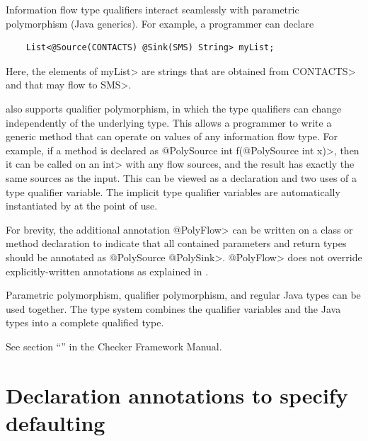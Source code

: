Information flow type qualifiers interact seamlessly with parametric polymorphism (Java
generics).  For example, a programmer can declare

\begin{Verbatim}
    List<@Source(CONTACTS) @Sink(SMS) String> myList;
\end{Verbatim}
\noindent
Here, the elements of \<myList> are strings
that are obtained from \<CONTACTS> and that may flow to \<SMS>.

\TheFlowChecker also supports qualifier polymorphism, in
which the type qualifiers can change independently of the underlying type.
This allows a programmer to write a generic method that can operate on values of
any information flow type.
For example, if a method is declared as
\<@PolySource int f(@PolySource int x)>, then it can be called on an \<int>
with any flow sources, and the result has exactly the same sources as the
input.  This can be viewed as a declaration and two uses of a type
qualifier variable.  The implicit type qualifier variables are
automatically instantiated by \theFlowChecker at the point of use.

For brevity,
the additional
annotation \<@PolyFlow> can be written on a class or method declaration to indicate that
all contained parameters and return types should be annotated as \<@PolySource
@PolySink>.  \<@PolyFlow> does not override explicitly-written annotations as explained
in .


Parametric polymorphism, qualifier polymorphism, and regular Java types can
be used together.  The type system combines the
qualifier variables and the Java types into a complete qualified type.

See section ``'' in the Checker Framework Manual.  




\section{Declaration annotations to specify defaulting\label{sec:additionalanno}}

